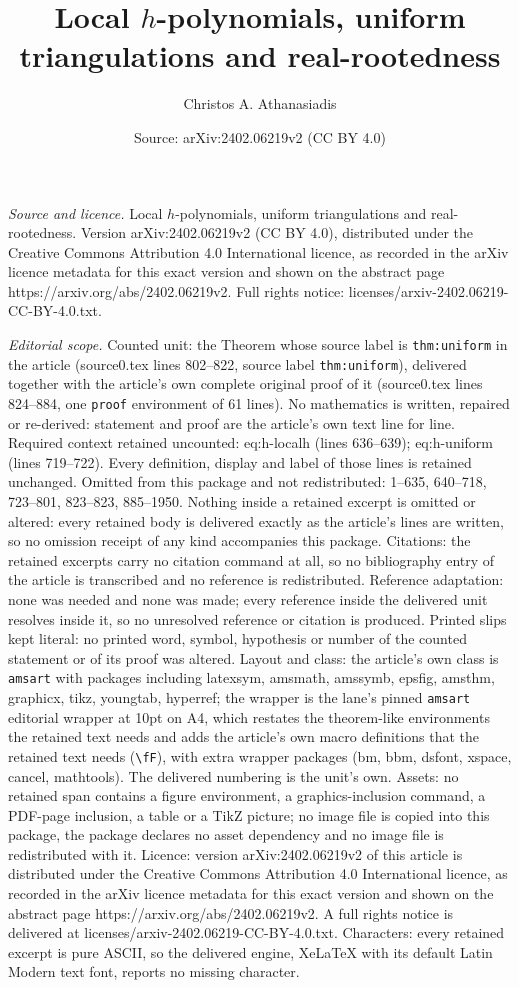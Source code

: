 \documentclass[10pt,a4paper]{amsart}
\title[Local $h$-polynomials, uniform triangulations and real-roote]{Local $h$-polynomials, uniform triangulations and real-rootedness}
\author{Christos A. Athanasiadis}
\date{Source: arXiv:2402.06219v2 (CC BY 4.0)}
\begin{document}
\maketitle

\noindent\emph{Source and licence.} Local $h$-polynomials, uniform triangulations and real-rootedness. Version arXiv:2402.06219v2 (CC BY 4.0), distributed under the Creative Commons Attribution 4.0 International licence, as recorded in the arXiv licence metadata for this exact version and shown on the abstract page https://arxiv.org/abs/2402.06219v2. Full rights notice: licenses/arxiv-2402.06219-CC-BY-4.0.txt.\par\smallskip

\noindent\textit{Editorial scope.} Counted unit: the Theorem whose source label is \texttt{thm:uniform} in the article (source0.tex lines 802--822, source label \texttt{thm:uniform}), delivered together with the article's own complete original proof of it (source0.tex lines 824--884, one \texttt{proof} environment of 61 lines). No mathematics is written, repaired or re-derived: statement and proof are the article's own text line for line. Required context retained uncounted: eq:h-localh (lines 636--639); eq:h-uniform (lines 719--722). Every definition, display and label of those lines is retained unchanged. Omitted from this package and not redistributed: 1--635, 640--718, 723--801, 823--823, 885--1950. Nothing inside a retained excerpt is omitted or altered: every retained body is delivered exactly as the article's lines are written, so no omission receipt of any kind accompanies this package. Citations: the retained excerpts carry no citation command at all, so no bibliography entry of the article is transcribed and no reference is redistributed. Reference adaptation: none was needed and none was made; every reference inside the delivered unit resolves inside it, so no unresolved reference or citation is produced. Printed slips kept literal: no printed word, symbol, hypothesis or number of the counted statement or of its proof was altered. Layout and class: the article's own class is \texttt{amsart} with packages including latexsym, amsmath, amssymb, epsfig, amsthm, graphicx, tikz, youngtab, hyperref; the wrapper is the lane's pinned \texttt{amsart} editorial wrapper at 10pt on A4, which restates the theorem-like environments the retained text needs and adds the article's own macro definitions that the retained text needs (\texttt{\textbackslash fF}), with extra wrapper packages (bm, bbm, dsfont, xspace, cancel, mathtools). The delivered numbering is the unit's own. Assets: no retained span contains a figure environment, a graphics-inclusion command, a PDF-page inclusion, a table or a TikZ picture; no image file is copied into this package, the package declares no asset dependency and no image file is redistributed with it. Licence: version arXiv:2402.06219v2 of this article is distributed under the Creative Commons Attribution 4.0 International licence, as recorded in the arXiv licence metadata for this exact version and shown on the abstract page https://arxiv.org/abs/2402.06219v2. A full rights notice is delivered at licenses/arxiv-2402.06219-CC-BY-4.0.txt. Characters: every retained excerpt is pure ASCII, so the delivered engine, XeLaTeX with its default Latin Modern text font, reports no missing character.
\end{document}
